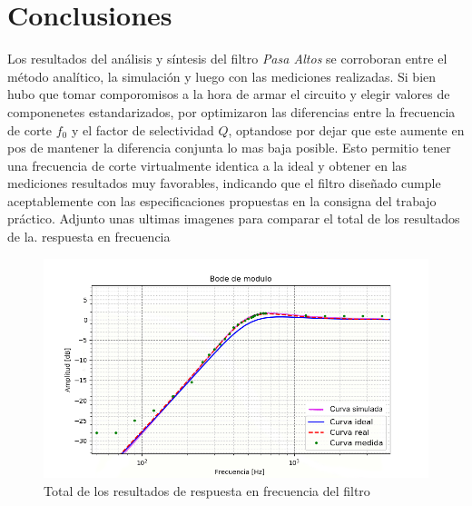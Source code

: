 \section*{Conclusiones}
\vspace{2ex}
Los resultados del an\'alisis y s\'intesis del filtro \textit{Pasa Altos} se corroboran entre el m\'etodo anal\'itico, la simulaci\'on y luego con las mediciones realizadas. Si bien hubo que tomar comporomisos a la hora de armar el circuito y elegir valores de componenetes estandarizados, por optimizaron las diferencias entre la frecuencia de corte $f_0$ y el factor de selectividad $Q$, optandose por dejar que este aumente en pos de mantener la diferencia conjunta lo mas baja posible. Esto permitio tener una frecuencia de corte virtualmente identica a la ideal y obtener en las mediciones resultados muy favorables, indicando que el filtro diseñado cumple aceptablemente con las especificaciones propuestas en la consigna del trabajo pr\'actico. Adjunto unas ultimas imagenes para comparar el total de los resultados de la. respuesta en frecuencia
\begin{centering}
	\begin{figure}[h]
		\centering
		\includegraphics[width=1\textwidth]{imagenes/ComparativaFinal.png}
		\caption{Total de los resultados de respuesta en frecuencia del filtro}
		
	\end{figure}	
\end{centering}

